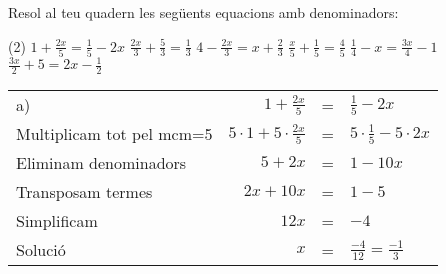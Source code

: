 \begin{mylist}
	

\exer[1]  Resol al teu quadern les següents equacions amb denominadors:
\begin{tasks}(2)
	\task ${ 1}+\frac{{ 2x}}{{ 5}} =\frac{{ 1}}{{ 5}} -{ 2x}$                                         
	\task  $\frac{{ 2x}}{{ 3}} +\frac{{ 5}}{{ 3}} =\frac{{ 1}}{{ 3}} $                    
	\task  ${ 4}-\frac{{ 2x}}{{ 3}} =x+\frac{{ 2}}{{ 3}} $              
	\task   $\frac{x}{{ 5}} +\frac{{ 1}}{{ 5}} =\frac{{ 4}}{{ 5}} $ 
	\task  $\frac{{ 1}}{{ 4}} -x=\frac{{ 3x}}{{ 4}} -{ 1}$           
	\task  $\frac{{ 3x}}{{ 2}} +{ 5}={ 2x}-\frac{{ 1}}{{ 2}} $           
\end{tasks}
\answers[cols=4]{[--1/3, --2, 2, 3, 5/7, 11]} 

\end{mylist}

\begin{example}
	\begin{tabular}{lrcl}
		a) \quad\quad\quad\quad\quad\quad\quad\quad\quad\quad\quad & ${ 1}+\frac{{ 2x}}{{ 5}}$ &=& $\frac{{ 1}}{{ 5}} -{ 2x}$  \\[0.25cm]
		Multiplicam tot pel mcm=5 & $5\cdot{ 1}+5\cdot\frac{{ 2x}}{{ 5}}$ &=& $5\cdot\frac{{ 1}}{{ 5}} -5\cdot{ 2x}$ \\[0.25cm]
		Eliminam denominadors & $5 +2x$ &=& $1 -10x$ \\ [0.25cm]
		Transposam termes& $ 2x+10x$ &=& $1-5$ \\[0.15cm]
		Simplificam & $12x$ &=& $-4$ \\[0.15cm]
		Solució & $x$ &=& $\frac{-4}{12}=\boxed{\frac{-1}{3}}$ \\
	\end{tabular}
\end{example}



